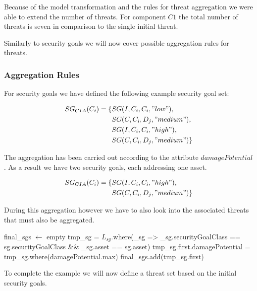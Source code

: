 Because of the model transformation and the rules for threat aggregation we were able to extend the number of threats. For component $C1$ the total number of threats is seven in comparison to the single initial threat.

Similarly to security goals we will now cover possible aggregation rules for threats. 

\subsubsection{Aggregation Rules}
\label{subsubsec:threat_aggregation}

For security goals we have defined the following example security goal set:

\begin{align*}
SG_{CIA}(C_i) = \{&SG(I,C_i,C_i,"low"),\\ &SG(C,C_i,D_j, "medium"),\\ &SG(I,C_i,C_i,"high"),\\ &SG(C,C_i,D_j, "medium")\} \\
\end{align*}

The aggregation has been carried out according to the attribute $damagePotential$. As a result we have two security goals, each addressing one asset.  

\begin{align*}
SG_{CIA}(C_i) = \{&SG(I,C_i,C_i,"high"),\\ &SG(C,C_i,D_j, "medium")\} \\
\end{align*}

During this aggregation however we have to also look into the associated threats that must also be aggregated. 

\begin{algorithm}[H] 
\begin{algorithmic}
\State final\_sgs $\gets$ empty
\State tmp\_sg = $L_{sg}$.where(\_sg => \_sg.securityGoalClass == sg.securityGoalClass  \&\& \_sg.asset == sg.asset)
\State tmp\_sg.first.damagePotential = tmp\_sg.where(damagePotential.max)
\State {}
\State final\_sgs.add(tmp\_sg.first)
\EndFor
\EndFunction
\end{algorithmic}
\end{algorithm}

To complete the example we will now define a threat set based on the initial security goals.

